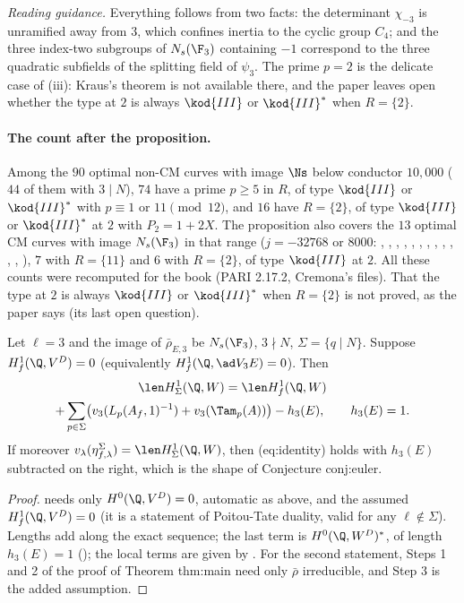\begin{sloppypar}
\noindent\emph{Reading guidance.} Everything follows from two facts: the determinant $\chi_{-3}$ is unramified away from $3$, which confines inertia to the cyclic group $C_4$; and
the three index-two subgroups of $N_s(\F_3)$ containing $-1$ correspond to the three quadratic subfields of the splitting field of $\psi_3$. The prime $p=2$ is the delicate case of (iii):
Kraus's theorem is not available there, and the paper leaves open whether the type at $2$ is always $\kod{III}$ or $\kod{III}^*$ when $R=\{2\}$.

\paragraph{The count after the proposition.} Among the $90$ optimal non-CM curves with image $\Ns$ below conductor $10{,}000$ ($44$ of them with $3\mid N$), $74$ have a prime $p\ge5$ in $R$,
of type $\kod{III}$ or $\kod{III}^*$ with $p\equiv1$ or $11\pmod{12}$, and $16$ have $R=\{2\}$, of type $\kod{III}$ or $\kod{III}^*$ at $2$ with $P_2=1+2X$. The proposition also covers the $13$ optimal CM curves
with image $N_s(\F_3)$ in that range ($j=-32768$ or $8000$: , , , , , , , , ,
, , , ), $7$ with $R=\{11\}$ and $6$ with $R=\{2\}$, of type $\kod{III}$ at $2$. All these counts were recomputed for the book (PARI 2.17.2,
Cremona's files). That the type at $2$ is always $\kod{III}$ or $\kod{III}^*$ when $R=\{2\}$ is not proved, as the paper says (its last open question).

\begin{proposition}\label{prop:paper:ns-conditional}
Let $\ell=3$ and the image of $\bar\rho_{E,3}$ be $N_s(\F_3)$, $3\nmid N$, $\Sigma=\{q\mid N\}$. Suppose $H^1_f(\Q,V^D)=0$ (equivalently $H^1_f(\Q,\ad V_3E)=0$). Then
\begin{multline*}
\len H^1_\Sigma(\Q,W)=\len H^1_f(\Q,W)\\
+\sum_{p\in\Sigma}\bigl(v_3(L_p(A_f,1)^{-1})+v_3(\Tam_p(A))\bigr)-h_3(E),\qquad h_3(E)=1.
\end{multline*}
If moreover $v_\lambda(\eta^\Sigma_{f,\lambda})=\len H^1_\Sigma(\Q,W)$, then (eq:identity) holds with $h_3(E)$ subtracted on the right, which is the shape of Conjecture conj:euler.
\end{proposition}

\begin{proof}
 needs only $H^0(\Q,V^D)=0$, automatic as above, and the assumed $H^1_f(\Q,V^D)=0$ (it is a statement of Poitou-Tate duality, valid for any $\ell\notin\Sigma$). Lengths add
along the exact sequence; the last term is $H^0(\Q,W^D)^*$, of length $h_3(E)=1$ (); the local terms are given by . For the second statement, Steps 1 and 2 of
the proof of Theorem thm:main need only $\bar\rho$ irreducible, and Step 3 is the added assumption.
\end{proof}


\end{sloppypar}
